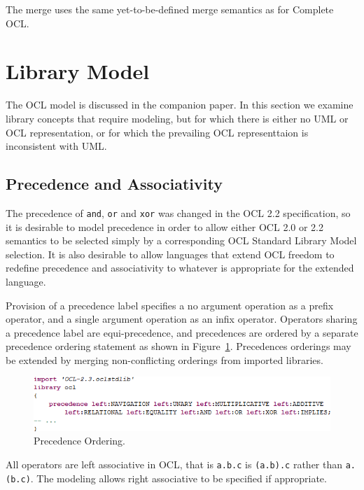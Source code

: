 \documentclass{eceasst}
\begin{document}
The merge uses the same yet-to-be-defined merge semantics as for Complete OCL.

\section{Library Model}\label{LibraryModel}

The OCL model is discussed in the companion paper\cite{OCL-UML}. In this section we examine library concepts that require modeling, but for which there is either no UML or OCL representation, or for which the prevailing OCL representtaion is inconsistent with UML.

\subsection{Precedence and Associativity}\label{Precedence}

The precedence of \verb|and|, \verb|or| and \verb|xor| was changed in the OCL 2.2 specification, so it is desirable to model precedence in order to allow either OCL 2.0 or 2.2 semantics to be selected simply by a corresponding OCL Standard Library Model selection. It is also desirable to allow languages that extend OCL freedom to redefine precedence and associativity to whatever is appropriate for the extended language.

Provision of a precedence label specifies a no argument operation as a prefix operator, and a single argument operation as an infix operator. Operators sharing a precedence label are equi-precedence, and precedences are ordered by a separate precedence ordering statement as shown in Figure~\ref{fig:Precedence}. Precedences orderings may be extended by merging non-conflicting orderings from imported libraries.

\begin{figure}
  \begin{center}
    \includegraphics[width=5.0in]{Precedence.png}
  \end{center}
  \caption{Precedence Ordering.}
  \label{fig:Precedence}
\end{figure}

All operators are left associative in OCL, that is \verb|a.b.c| is \verb|(a.b).c| rather than \verb|a.(b.c)|. The modeling allows right associative to be specified if appropriate.
\end{document}
